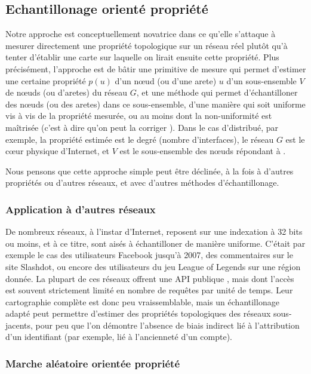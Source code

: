 \subsection{Echantillonage orienté propriété}
\label{subsec:conclusion-sampling}

Notre approche est conceptuellement novatrice dans ce qu'elle s'attaque à
mesurer directement une propriété topologique sur un réseau réel plutôt qu'à
tenter d'établir une carte sur laquelle on lirait ensuite cette propriété. Plus
précisément, l'approche est de bâtir une primitive de mesure qui permet
d'estimer une certaine propriété $p(u)$ d'un n\oe{}ud (ou d'une arete) $u$ d'un
sous-ensemble $V$ de n\oe{}uds (ou d'aretes) du réseau $G$, et une méthode qui
permet d'échantilloner des n\oe{}uds (ou des aretes) dans ce sous-ensemble,
d'une manière qui soit uniforme vis à vis de la propriété mesurée, ou au moins
dont la non-uniformité est maîtrisée (c'est à dire qu'on peut la corriger
\aposteriori). Dans le cas d'\udpping distribué, par exemple, la propriété
estimée est le degré (nombre d'interfaces), le réseau $G$ est le c\oe{}ur
physique d'Internet, et $V$ est le sous-ensemble des n\oe{}uds répondant à
\udpping.

Nous pensons que cette approche simple peut être déclinée, à la fois à d'autres
propriétés ou d'autres réseaux, et avec d'autres méthodes d'échantillonage.

\subsubsection{Application à d'autres réseaux}

De nombreux réseaux, à l'instar d'Internet, reposent sur une indexation
à 32 bits ou moins, et à ce titre, sont aisés à échantilloner de manière
uniforme.
C'était par exemple le cas des utilisateurs Facebook jusqu'à 2007, des
commentaires sur le site Slashdot, ou encore des utilisateurs du jeu League of
Legends sur une région donnée. La plupart de ces réseaux offrent une API
publique \http, mais dont l'accès est souvent strictement limité en nombre de
requêtes par unité de temps. Leur cartographie complète est donc peu
vraissemblable, mais un échantillonage adapté peut permettre d'estimer des
propriétés topologiques des réseaux sous-jacents, pour peu que l'on démontre
l'absence de biais indirect lié à l'attribution d'un identifiant (par exemple,
lié à l'ancienneté d'un compte).

\subsubsection{Marche aléatoire orientée propriété}

